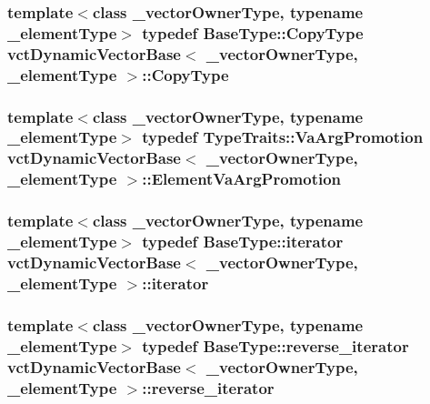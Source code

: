\hypertarget{classvct_dynamic_vector_base_a62fcc6341849207c5273566d0bce3cf5}{
\subsubsection[{Copy\-Type}]{\setlength{\rightskip}{0pt plus 5cm}template$<$class \-\_\-vector\-Owner\-Type, typename \-\_\-element\-Type$>$ typedef {\bf Base\-Type\-::\-Copy\-Type} {\bf vct\-Dynamic\-Vector\-Base}$<$ \-\_\-vector\-Owner\-Type, \-\_\-element\-Type $>$\-::{\bf Copy\-Type}}}\label{classvct_dynamic_vector_base_a62fcc6341849207c5273566d0bce3cf5}
\hypertarget{classvct_dynamic_vector_base_a74f36531adfd7ec68ac6500176134156}{
\subsubsection[{Element\-Va\-Arg\-Promotion}]{\setlength{\rightskip}{0pt plus 5cm}template$<$class \-\_\-vector\-Owner\-Type, typename \-\_\-element\-Type$>$ typedef {\bf Type\-Traits\-::\-Va\-Arg\-Promotion} {\bf vct\-Dynamic\-Vector\-Base}$<$ \-\_\-vector\-Owner\-Type, \-\_\-element\-Type $>$\-::{\bf Element\-Va\-Arg\-Promotion}}}\label{classvct_dynamic_vector_base_a74f36531adfd7ec68ac6500176134156}
\hypertarget{classvct_dynamic_vector_base_a5f711892fff6a5b01aa014db476f3084}{
\subsubsection[{iterator}]{\setlength{\rightskip}{0pt plus 5cm}template$<$class \-\_\-vector\-Owner\-Type, typename \-\_\-element\-Type$>$ typedef {\bf Base\-Type\-::iterator} {\bf vct\-Dynamic\-Vector\-Base}$<$ \-\_\-vector\-Owner\-Type, \-\_\-element\-Type $>$\-::{\bf iterator}}}\label{classvct_dynamic_vector_base_a5f711892fff6a5b01aa014db476f3084}
\hypertarget{classvct_dynamic_vector_base_ad569da2c70b9f9468f466f59535d53c7}{
\subsubsection[{reverse\-\_\-iterator}]{\setlength{\rightskip}{0pt plus 5cm}template$<$class \-\_\-vector\-Owner\-Type, typename \-\_\-element\-Type$>$ typedef {\bf Base\-Type\-::reverse\-\_\-iterator} {\bf vct\-Dynamic\-Vector\-Base}$<$ \-\_\-vector\-Owner\-Type, \-\_\-element\-Type $>$\-::{\bf reverse\-\_\-iterator}}}\label{classvct_dynamic_vector_base_ad569da2c70b9f9468f466f59535d53c7}

